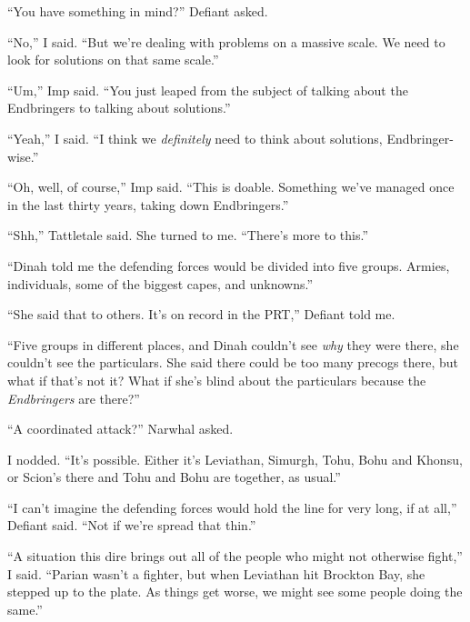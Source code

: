 





``You have something in mind?'' Defiant asked.



``No,'' I said.  ``But we're dealing with problems on a massive scale.  We need to look for solutions on that same scale.''



``Um,'' Imp said.  ``You just leaped from the subject of talking about the Endbringers to talking about solutions.''



``Yeah,'' I said.  ``I think we \emph{definitely} need to think about solutions, Endbringer-wise.''



``Oh, well, of course,'' Imp said.  ``This is doable.  Something we've managed once in the last thirty years, taking down Endbringers.''



``Shh,'' Tattletale said.  She turned to me.  ``There's more to this.''



``Dinah told me the defending forces would be divided into five groups.  Armies, individuals, some of the biggest capes, and unknowns.''



``She said that to others.  It's on record in the PRT,'' Defiant told me.



``Five groups in different places, and Dinah couldn't see \emph{why} they were there, she couldn't see the particulars.  She said there could be too many precogs there, but what if that's not it?  What if she's blind about the particulars because the \emph{Endbringers} are there?''



``A coordinated attack?'' Narwhal asked.



I nodded.  ``It's possible.  Either it's Leviathan, Simurgh, Tohu, Bohu and Khonsu, or Scion's there and Tohu and Bohu are together, as usual.''



``I can't imagine the defending forces would hold the line for very long, if at all,'' Defiant said.  ``Not if we're spread that thin.''



``A situation this dire brings out all of the people who might not otherwise fight,'' I said.  ``Parian wasn't a fighter, but when Leviathan hit Brockton Bay, she stepped up to the plate.  As things get worse, we might see some people doing the same.''



